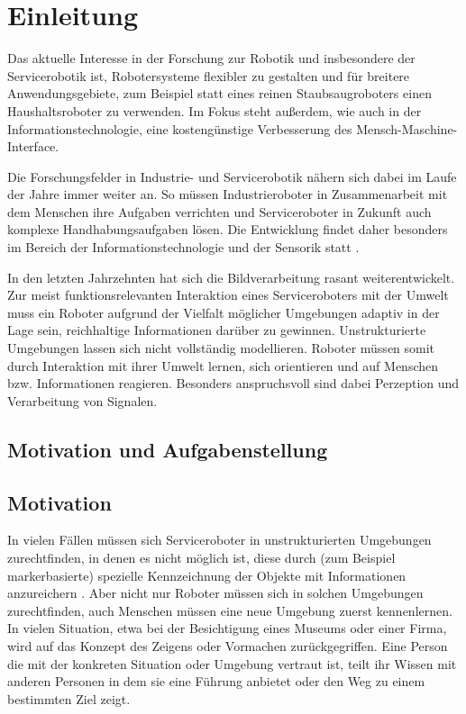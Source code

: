 \chapter{Einleitung}
\label{einleitung_cha}
Das aktuelle Interesse in der Forschung zur Robotik und insbesondere der Servicerobotik ist, Robotersysteme flexibler zu gestalten und für breitere Anwendungsgebiete, zum Beispiel statt eines reinen Staubsaugroboters einen Haushaltsroboter zu verwenden.
Im Fokus steht außerdem, wie auch in der Informationstechnologie, eine kostengünstige Verbesserung des Mensch-Maschine-Interface.
 \citep{IP08}

Die Forschungsfelder in Industrie- und Servicerobotik nähern sich dabei im Laufe der Jahre immer weiter an.
 So müssen Industrieroboter in Zusammenarbeit mit dem Menschen ihre Aufgaben verrichten und Serviceroboter
 in Zukunft auch komplexe Handhabungsaufgaben lösen. Die Entwicklung findet daher besonders im Bereich der
 Informationstechnologie und der Sensorik statt \citep{Michael2010}.
 
In den letzten Jahrzehnten hat sich die Bildverarbeitung rasant weiterentwickelt.
 Zur meist funktionsrelevanten Interaktion eines Serviceroboters mit der Umwelt muss
 ein Roboter aufgrund der Vielfalt möglicher Umgebungen adaptiv in der Lage sein, reichhaltige
 Informationen darüber zu gewinnen. Unstrukturierte Umgebungen lassen sich nicht vollständig modellieren.
 Roboter müssen somit durch Interaktion mit ihrer Umwelt lernen, sich orientieren und auf Menschen bzw. Informationen reagieren.
 Besonders anspruchsvoll sind dabei Perzeption und Verarbeitung von Signalen.

\section{Motivation und Aufgabenstellung}
\label{motivation_sec}

\section{Motivation}
\label{motivation_real_sec}


In vielen Fällen müssen sich Serviceroboter in unstrukturierten Umgebungen zurechtfinden, in denen es nicht möglich ist, diese durch
 (zum Beispiel markerbasierte) spezielle Kennzeichnung der Objekte mit Informationen anzureichern \citep{sturm10rss-workshop}. Aber nicht nur Roboter müssen sich in solchen Umgebungen zurechtfinden, auch Menschen müssen eine neue Umgebung zuerst kennenlernen. In vielen Situation, etwa bei der Besichtigung eines Museums oder einer Firma, wird auf das Konzept des Zeigens oder Vormachen zurückgegriffen. Eine Person die mit der konkreten Situation oder Umgebung vertraut ist, teilt ihr Wissen mit anderen Personen in dem sie eine Führung anbietet oder den Weg zu einem bestimmten Ziel zeigt.

